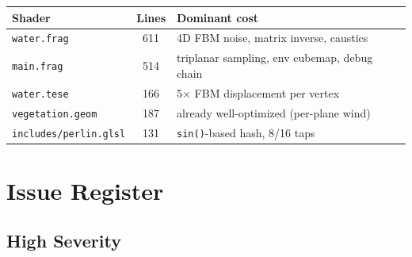 \documentclass[a4paper,12pt]{article}
\begin{document}
\begin{center}
\begin{tabular}{lcl}
\toprule
\textbf{Shader} & \textbf{Lines} & \textbf{Dominant cost} \\
\midrule
\texttt{water.frag}      & 611 & 4D FBM noise, matrix inverse, caustics \\
\texttt{main.frag}       & 514 & triplanar sampling, env cubemap, debug chain \\
\texttt{water.tese}      & 166 & 5$\times$ FBM displacement per vertex \\
\texttt{vegetation.geom} & 187 & already well-optimized (per-plane wind) \\
\texttt{includes/perlin.glsl} & 131 & \texttt{sin()}-based hash, 8/16 taps \\
\bottomrule
\end{tabular}
\end{center}

\newpage

\section{Issue Register}

\subsection{High Severity}
\end{document}
